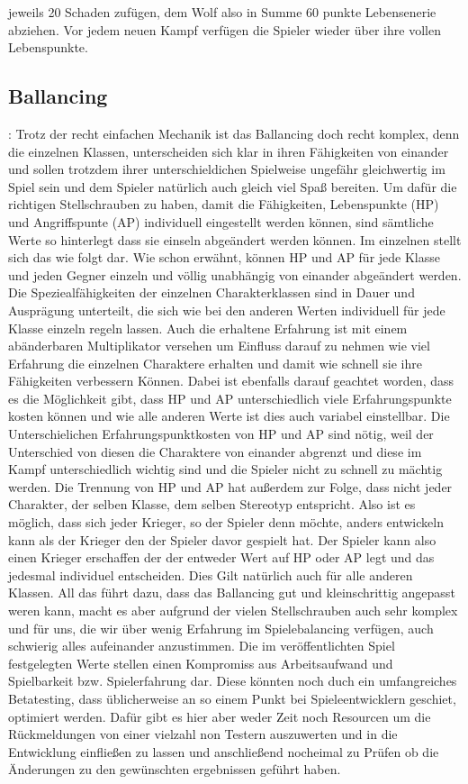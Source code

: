 jeweils 20 Schaden zufügen, dem Wolf also in Summe 60 punkte Lebensenerie abziehen. Vor jedem neuen Kampf verfügen die Spieler wieder über ihre vollen Lebenspunkte.

\subsection{Ballancing}: Trotz der recht einfachen Mechanik ist das Ballancing doch recht komplex, denn die einzelnen Klassen, unterscheiden sich klar in ihren Fähigkeiten von einander und sollen trotzdem ihrer unterschieldichen Spielweise ungefähr gleichwertig im Spiel sein und dem Spieler natürlich auch gleich viel Spaß bereiten. Um dafür die richtigen Stellschrauben zu haben, damit die Fähigkeiten, Lebenspunkte (HP) und Angriffspunte (AP) individuell eingestellt werden können, sind sämtliche Werte so hinterlegt dass sie einseln abgeändert werden können. Im einzelnen stellt sich das wie folgt dar. Wie schon erwähnt, können HP und AP für jede Klasse und jeden Gegner einzeln und völlig unabhängig von einander abgeändert werden. Die Speziealfähigkeiten der einzelnen Charakterklassen sind in Dauer und Ausprägung unterteilt, die sich wie bei den anderen Werten individuell für jede Klasse einzeln regeln lassen. Auch die erhaltene Erfahrung ist mit einem abänderbaren Multiplikator versehen um Einfluss darauf zu nehmen wie viel Erfahrung die einzelnen Charaktere erhalten und damit wie schnell sie ihre Fähigkeiten verbessern Können. Dabei ist ebenfalls darauf geachtet worden, dass es die Möglichkeit gibt, dass HP und AP unterschiedlich viele Erfahrungspunkte kosten können und wie alle anderen Werte ist dies auch variabel einstellbar. Die Unterschielichen Erfahrungspunktkosten von HP und AP sind nötig, weil der Unterschied von diesen die Charaktere von einander abgrenzt und diese im Kampf unterschiedlich wichtig sind und die Spieler nicht zu schnell zu mächtig werden.
Die Trennung von HP und AP hat außerdem zur Folge, dass nicht jeder Charakter, der selben Klasse, dem selben Stereotyp entspricht. Also ist es möglich, dass sich jeder Krieger, so der Spieler denn möchte, anders entwickeln kann als der Krieger den der Spieler davor gespielt hat. Der Spieler kann also einen Krieger erschaffen der der entweder Wert auf HP oder AP legt und das jedesmal individuel entscheiden. Dies Gilt natürlich auch für alle anderen Klassen. All das führt dazu, dass das Ballancing gut und kleinschrittig angepasst weren kann, macht es aber aufgrund der vielen Stellschrauben auch sehr komplex und für uns, die wir über wenig Erfahrung im Spielebalancing verfügen, auch schwierig alles aufeinander anzustimmen. Die im veröffentlichten Spiel festgelegten Werte stellen einen Kompromiss aus Arbeitsaufwand und Spielbarkeit bzw. Spielerfahrung dar. Diese könnten noch duch ein umfangreiches Betatesting, dass üblicherweise an so einem Punkt bei Spieleentwicklern geschiet, optimiert werden. Dafür gibt es hier aber weder Zeit noch Resourcen um die Rückmeldungen von einer vielzahl non Testern auszuwerten und in die Entwicklung einfließen zu lassen und anschließend nocheimal zu Prüfen ob die Änderungen zu den gewünschten ergebnissen geführt haben.

